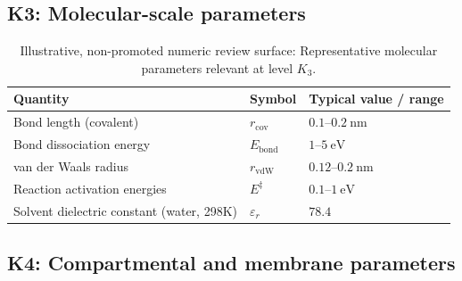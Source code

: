 
\subsection*{K3: Molecular-scale parameters}

\begin{table}[htbp]
  \centering
  \caption{Illustrative, non-promoted numeric review surface: Representative molecular parameters relevant at level \(K_3\).}
  \label{tab:k3-molecular-parameters}
  \begin{tabular}{@{}L{0.44\textwidth}L{0.16\textwidth}L{0.23\textwidth}@{}}
    \hline
    Quantity & Symbol & Typical value / range \\
    \hline
    Bond length (covalent) & \(r_\mathrm{cov}\)
        & \(0.1\text{–}0.2~\mathrm{nm}\) \\
    Bond dissociation energy & \(E_\mathrm{bond}\)
        & \(1\text{–}5~\mathrm{eV}\) \\
    van der Waals radius & \(r_\mathrm{vdW}\)
        & \(0.12\text{–}0.2~\mathrm{nm}\) \\
    Reaction activation energies & \(E^\ddagger\)
        & \(0.1\text{–}1~\mathrm{eV}\) \\
    Solvent dielectric constant (water, 298K)
        & \(\varepsilon_r\)
        & \(78.4\) \\
    \hline
  \end{tabular}
\end{table}


\subsection*{K4: Compartmental and membrane parameters}

